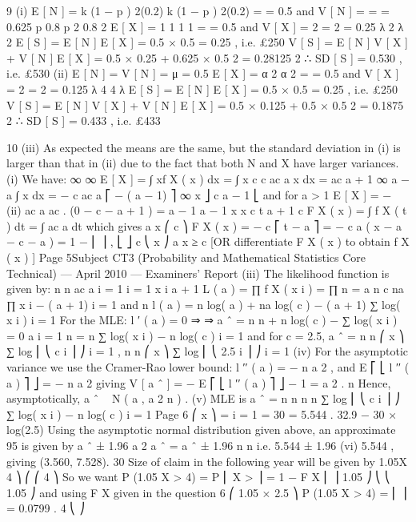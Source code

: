 \documentclass[a4paper,12pt]{article}
\begin{document}


9
(i)
E [ N ] = k (1 − p ) 2(0.2)
k (1 − p ) 2(0.2)
=
= 0.5 and V [ N ] =
=
= 0.625
p
0.8
p 2
0.8 2
E [ X ] = 1 1
1
1
= = 0.5 and V [ X ] = 2 = 2 = 0.25
λ 2
λ
2
E [ S ] = E [ N ] E [ X ] = 0.5 × 0.5 = 0.25 , i.e. £250
V [ S ] = E [ N ] V [ X ] + V [ N ] { E [ X ] } = 0.5 × 0.25 + 0.625 × 0.5 2 = 0.28125
2
∴ SD [ S ] = 0.530 , i.e. £530
(ii)
E [ N ] = V [ N ] = μ = 0.5
E [ X ] =
α 2
α
2
= = 0.5 and V [ X ] = 2 = 2 = 0.125
λ 4
4
λ
E [ S ] = E [ N ] E [ X ] = 0.5 × 0.5 = 0.25 , i.e. £250
V [ S ] = E [ N ] V [ X ] + V [ N ] { E [ X ] } = 0.5 × 0.125 + 0.5 × 0.5 2 = 0.1875
2
∴ SD [ S ] = 0.433 , i.e. £433


\newpage

10
(iii) As expected the means are the same,
but the standard deviation in (i) is larger than that in (ii) due to the fact that
both N and X have larger variances.
(i) We have:
∞
∞
E [ X ] = ∫ xf X ( x ) dx = ∫ x
c
c
ac a
x
dx = ac
a + 1
∞
a
− a
∫ x dx = −
c
ac a ⎡ − ( a − 1) ⎤ ∞
x
⎦ c
a − 1 ⎣
and for a > 1
E [ X ] = −
(ii)
ac a
ac
.
(0 − c − a + 1 ) =
a − 1
a − 1
x x
c t a + 1
c
F X ( x ) = ∫ f X ( t ) dt = ∫
ac a
dt
which gives
a
x
⎛ c ⎞
F X ( x ) = − c ⎡ t − a ⎤ = − c a ( x − a − c − a ) = 1 − ⎜ ⎟ ,
⎣ ⎦ c
⎝ x ⎠
a
x ≥ c
[OR differentiate F X ( x ) to obtain f X ( x ) ]
Page 5Subject CT3 (Probability and Mathematical Statistics Core Technical) — April 2010 — Examiners’ Report
(iii)
The likelihood function is given by:
n n ac a
i = 1 i = 1 x i a + 1
L ( a ) = ∏ f X ( x i ) = ∏
n
= a n c na ∏ x i − ( a + 1)
i = 1
and
n
l ( a ) = n log( a ) + na log( c ) − ( a + 1) ∑ log( x i )
i = 1
For the MLE:
l ′ ( a ) = 0 ⇒
⇒ a ˆ =
n
n
+ n log( c ) − ∑ log( x i ) = 0
a
i = 1
n
=
n
∑ log( x i ) − n log( c )
i = 1
and for c = 2.5, a ˆ =
n
n
⎛ x ⎞
∑ log ⎜ ⎝ c i ⎟ ⎠
i = 1
,
n
n
⎛ x ⎞
∑ log ⎜ ⎝ 2.5 i ⎟ ⎠
i = 1
(iv)
For the asymptotic variance we use the Cramer-Rao lower bound:
l ′′ ( a ) = −
n
a
2
, and E ⎡ ⎣ l ′′ ( a ) ⎤ ⎦ = −
n
a 2
giving
{
}
V [ a ˆ ] = − E ⎡ ⎣ l ′′ ( a ) ⎤ ⎦
− 1
=
a 2
.
n
Hence, asymptotically, a ˆ ~ N ( a , a 2 n ) .
(v)
MLE is
a ˆ =
n
n
n
n
∑ log ⎜ ⎝ c i ⎟ ⎠ ∑ log( x i ) − n log( c )
i = 1
Page 6
⎛ x ⎞
=
i = 1
=
30
= 5.544 .
32.9 − 30 × log(2.5)
Using the asymptotic normal distribution given above, an approximate 95%
is given by
a ˆ ± 1.96
a 2
a ˆ
= a ˆ ± 1.96
n
n
i.e. 5.544 ± 1.96
(vi)
5.544
, giving (3.560, 7.528).
30
Size of claim in the following year will be given by 1.05X
4 ⎞
⎛
⎛ 4 ⎞
So we want P (1.05 X > 4) = P ⎜ X >
⎟ = 1 − F X ⎜
⎟
1.05 ⎠
⎝
⎝ 1.05 ⎠
and using F X given in the question
6
⎛ 1.05 × 2.5 ⎞
P (1.05 X > 4) = ⎜
⎟ = 0.0799 .
4
⎝
⎠

\end{document}
